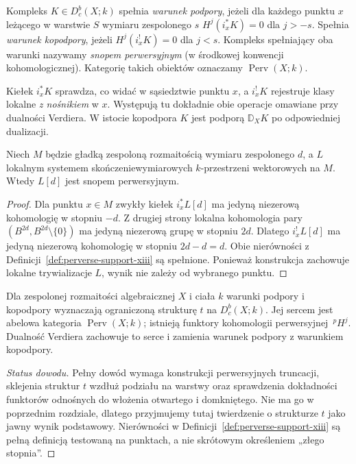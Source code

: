 \begin{definicja}
\label{def:perverse-support-xiii}
Kompleks $K\in D_c^b(X;k)$ spełnia
\emph{warunek podpory}, jeżeli dla każdego punktu $x$
leżącego w warstwie $S$ wymiaru zespolonego $s$
$H^j(i_x^*K)=0$ dla $j>-s$.
Spełnia \emph{warunek kopodpory}, jeżeli
$H^j(i_x^!K)=0$ dla $j<s$.
Kompleks spełniający oba warunki nazywamy
\emph{snopem perwersyjnym} (w środkowej konwencji
kohomologicznej). Kategorię takich obiektów oznaczamy
$\operatorname{Perv}(X;k)$.
\end{definicja}
\begin{uwaga}
Kiełek $i_x^*K$ sprawdza, co widać w sąsiedztwie
punktu $x$, a $i_x^!K$ rejestruje klasy lokalne
\emph{z nośnikiem} w $x$. Występują tu dokładnie
obie operacje omawiane przy dualności Verdiera.
W istocie kopodpora $K$ jest podporą
$\mathbb D_XK$ po odpowiedniej dualizacji.
\end{uwaga}

\begin{stwierdzenie}
\label{prop:smooth-perverse-xiii}
Niech $M$ będzie gładką zespoloną rozmaitością
wymiaru zespolonego $d$, a $L$ lokalnym systemem
skończeniewymiarowych $k$-przestrzeni wektorowych
na $M$. Wtedy $L[d]$ jest snopem perwersyjnym.
\end{stwierdzenie}
\begin{proof}
Dla punktu $x\in M$ zwykły kiełek $i_x^*L[d]$
ma jedyną niezerową kohomologię w stopniu $-d$.
Z drugiej strony lokalna kohomologia pary
$(B^{2d},B^{2d}\setminus\{0\})$ ma jedyną niezerową
grupę w stopniu $2d$. Dlatego $i_x^!L[d]$
ma jedyną niezerową kohomologię w stopniu
$2d-d=d$. Obie nierówności z
Definicji~\ref{def:perverse-support-xiii}
są spełnione. Ponieważ konstrukcja zachowuje
lokalne trywializacje $L$, wynik nie zależy od
wybranego punktu.
\end{proof}

\begin{twierdzenie}
\label{thm:heart-perverse-xiii}
Dla zespolonej rozmaitości algebraicznej $X$
i ciała $k$ warunki podpory i kopodpory wyznaczają
ograniczoną strukturę $t$ na $D_c^b(X;k)$.
Jej sercem jest abelowa kategoria
$\operatorname{Perv}(X;k)$; istnieją funktory
kohomologii perwersyjnej $\,{}^p\!H^j$.
Dualność Verdiera zachowuje to serce i zamienia
warunek podpory z warunkiem kopodpory.
\end{twierdzenie}
\begin{proof}[Status dowodu]
Pełny dowód wymaga konstrukcji perwersyjnych
truncacji, sklejenia struktur $t$ wzdłuż podziału
na warstwy oraz sprawdzenia dokładności funktorów
odnośnych do włożenia otwartego i domkniętego.
Nie ma go w poprzednim rozdziale, dlatego
przyjmujemy tutaj twierdzenie o strukturze $t$
jako jawny wynik podstawowy. Nierówności w
Definicji~\ref{def:perverse-support-xiii}
są pełną definicją testowaną na punktach,
a nie skrótowym określeniem „złego stopnia”.
\end{proof}

